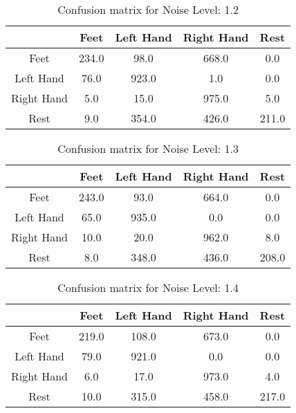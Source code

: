 \begin{table}[!htbp]
    \centering
    \begin{tabular}{|c||c|c|c|c|}
        \hline
		 & Feet & Left Hand & Right Hand & Rest \\
        \hline
        \hline
        Feet & 234.0 & 98.0 & 668.0 & 0.0 \\
        \hline
        Left Hand & 76.0 & 923.0 & 1.0 & 0.0 \\
        \hline
        Right Hand & 5.0 & 15.0 & 975.0 & 5.0 \\
        \hline
        Rest & 9.0 & 354.0 & 426.0 & 211.0 \\
        \hline
    \end{tabular}
    \caption{Confusion matrix for Noise Level: 1.2}
\end{table}

\begin{table}[!htbp]
    \centering
    \begin{tabular}{|c||c|c|c|c|}
        \hline
		 & Feet & Left Hand & Right Hand & Rest \\
        \hline
        \hline
        Feet & 243.0 & 93.0 & 664.0 & 0.0 \\
        \hline
        Left Hand & 65.0 & 935.0 & 0.0 & 0.0 \\
        \hline
        Right Hand & 10.0 & 20.0 & 962.0 & 8.0 \\
        \hline
        Rest & 8.0 & 348.0 & 436.0 & 208.0 \\
        \hline
    \end{tabular}
    \caption{Confusion matrix for Noise Level: 1.3}
\end{table}

\begin{table}[!htbp]
    \centering
    \begin{tabular}{|c||c|c|c|c|}
        \hline
		 & Feet & Left Hand & Right Hand & Rest \\
        \hline
        \hline
        Feet & 219.0 & 108.0 & 673.0 & 0.0 \\
        \hline
        Left Hand & 79.0 & 921.0 & 0.0 & 0.0 \\
        \hline
        Right Hand & 6.0 & 17.0 & 973.0 & 4.0 \\
        \hline
        Rest & 10.0 & 315.0 & 458.0 & 217.0 \\
        \hline
    \end{tabular}
    \caption{Confusion matrix for Noise Level: 1.4}
\end{table}

